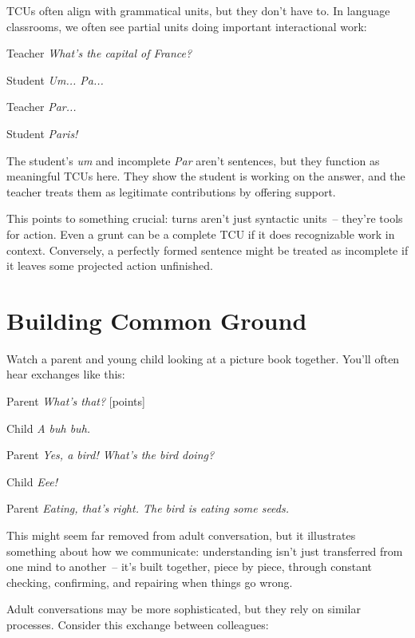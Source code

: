 TCUs often align with grammatical units, but they don't have to. In language classrooms, we often see partial units doing important interactional work:

\ea
\begin{dialogue}
\item[Teacher] \textit{What's the capital of France?}
\item[Student] \textit{Um... Pa...}
\item[Teacher] \textit{Par...}
\item[Student] \textit{Paris!}
\end{dialogue}
\z
The student's \textit{um} and incomplete \textit{Par} aren't sentences, but they function as meaningful TCUs here. They show the student is working on the answer, and the teacher treats them as legitimate contributions by offering support.

This points to something crucial: turns aren't just syntactic units~-- they're tools for action. Even a grunt can be a complete TCU if it does recognizable work in context. Conversely, a perfectly formed sentence might be treated as incomplete if it leaves some projected action unfinished.

\section{Building Common Ground} \label{sec:common-ground}

Watch a parent and young child looking at a picture book together. You'll often hear exchanges like this:

\ea
\begin{dialogue}
\item[Parent] \textit{What's that?} [points]
\item[Child] \textit{A buh buh.}
\item[Parent] \textit{Yes, a bird! What's the bird doing?}
\item[Child] \textit{Eee!}
\item[Parent] \textit{Eating, that's right. The bird is eating some seeds.}
\end{dialogue}
\z
This might seem far removed from adult conversation, but it illustrates something about how we communicate: understanding isn't just transferred from one mind to another~-- it's built together, piece by piece, through constant checking, confirming, and repairing when things go wrong.

Adult conversations may be more sophisticated, but they rely on similar processes. Consider this exchange between colleagues:

